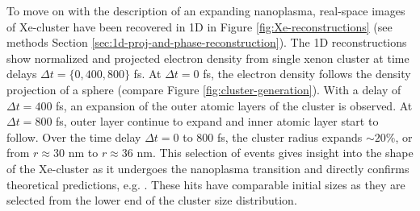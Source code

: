 To move on with the description of an expanding nanoplasma, real-space images of Xe-cluster have been recovered in 1D in Figure \ref{fig:Xe-reconstructions} (see methods Section \ref{sec:1d-proj-and-phase-reconstruction}). The 1D reconstructions show normalized and projected electron density from single xenon cluster at time delays $\Delta t=\{0, 400, 800\}$ fs. At $\Delta t = 0$ fs, the electron density follows the density projection of a sphere (compare Figure \ref{fig:cluster-generation}). With a delay of $\Delta t = 400$ fs, an expansion of the outer atomic layers of the cluster is observed. At $\Delta t = 800$ fs, outer layer continue to expand and inner atomic layer start to follow. Over the time delay $\Delta t=0$ to $800$ fs, the cluster radius expands $\sim 20\%$, or from $r\approx 30$ nm to $r\approx 36$ nm. This selection of events gives insight into the shape of the Xe-cluster as it undergoes the nanoplasma transition and directly confirms theoretical predictions, e.g. \citep{Hau-Riege-2004-PRE}. These hits have comparable initial sizes as they are selected from the lower end of the cluster size distribution.\\
